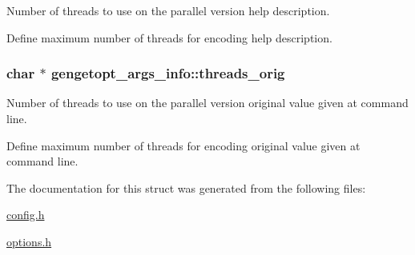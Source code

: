 Number of threads to use on the parallel version help description. 

Define maximum number of threads for encoding help description. \hypertarget{structgengetopt__args__info_af662fdbee2edf0b387c71da07331d9fe}{}
\subsubsection[{threads\+\_\+orig}]{\setlength{\rightskip}{0pt plus 5cm}char $\ast$ gengetopt\+\_\+args\+\_\+info\+::threads\+\_\+orig}\label{structgengetopt__args__info_af662fdbee2edf0b387c71da07331d9fe}


Number of threads to use on the parallel version original value given at command line. 

Define maximum number of threads for encoding original value given at command line. 

The documentation for this struct was generated from the following files\+:\begin{DoxyCompactItemize}
\item 
\hyperlink{config_8h}{config.\+h}\item 
\hyperlink{options_8h}{options.\+h}\end{DoxyCompactItemize}
